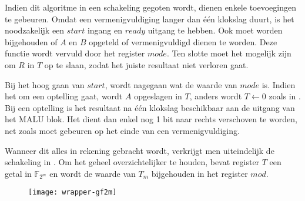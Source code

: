 Indien dit algoritme in een schakeling gegoten wordt, dienen enkele toevoegingen te gebeuren. Omdat een vermenigvuldiging langer dan \'e\'en klokslag duurt, is het noodzakelijk een $start$ ingang en $ready$ uitgang te hebben. Ook moet worden bijgehouden of $A$ en $B$ opgeteld of vermenigvuldigd dienen te worden. Deze functie wordt vervuld door het register $mode$. Ten slotte moet het mogelijk zijn om $R$ in $T$ op te slaan, zodat het juiste resultaat niet verloren gaat.

Bij het hoog gaan van $start$, wordt nagegaan wat de waarde van $mode$ is. Indien het om een optelling gaat, wordt $A$ opgeslagen in $T$, anders wordt $T \leftarrow 0$ zoals in . Bij een optelling is het resultaat na \'e\'en klokslag beschikbaar aan de uitgang van het MALU blok. Het dient dan enkel nog 1 bit naar rechts verschoven te worden, net zoals moet gebeuren op het einde van een vermenigvuldiging.

Wanneer dit alles in rekening gebracht wordt, verkrijgt men uiteindelijk de schakeling in . Om het geheel overzichtelijker te houden, bevat register $T$ een getal in $\mathbb{F}_{2^m}$ en wordt de waarde van $T_m$ bijgehouden in het register $mod$.

\begin{figure}[h]
	\begin{center}
		\texttt{[image: wrapper-gf2m]}
		\label{figuur-implementatie-wrapper-gf2m}
	\end{center}
\end{figure}


